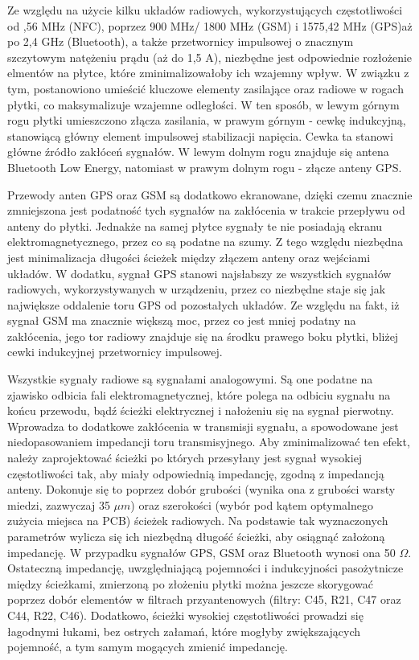 Ze względu na użycie kilku układów radiowych, wykorzystujących częstotliwości od ,56 MHz (NFC), poprzez 900 MHz/ 1800 MHz (GSM) i 1575,42 MHz (GPS)\linebreak aż po 2,4 GHz (Bluetooth), a także przetwornicy impulsowej o znacznym szczytowym natężeniu prądu (aż do 1,5 A), niezbędne jest odpowiednie rozłożenie elmentów na płytce, które zminimalizowałoby ich wzajemny wpływ. W związku z tym, postanowiono umieścić kluczowe elementy zasilające oraz radiowe w rogach płytki, co maksymalizuje wzajemne odległości. W ten sposób, w lewym górnym rogu płytki umieszczono złącza zasilania, w prawym górnym - cewkę indukcyjną, stanowiącą główny element impulsowej stabilizacji napięcia. Cewka ta stanowi główne źródło zakłóceń sygnałów. W lewym dolnym rogu znajduje się antena Bluetooth Low Energy, natomiast w prawym dolnym rogu - złącze anteny GPS. 

Przewody anten GPS oraz GSM są dodatkowo ekranowane, dzięki czemu znacznie zmniejszona jest podatność tych sygnałów na zakłócenia w trakcie przepływu od anteny do płytki. Jednakże na samej płytce sygnały te nie posiadają ekranu elektromagnetycznego, przez co są podatne na szumy. Z tego względu niezbędna jest minimalizacja długości ścieżek między złączem anteny oraz wejściami układów. W dodatku, sygnał GPS stanowi najsłabszy ze wszystkich sygnałów radiowych, wykorzystywanych w urządzeniu, przez co niezbędne staje się  jak największe oddalenie toru GPS od pozostałych układów. Ze względu na fakt, iż sygnał GSM ma znacznie większą moc, przez co jest mniej podatny na zakłócenia, jego tor radiowy znajduje się na środku prawego boku płytki, bliżej cewki indukcyjnej przetwornicy impulsowej. 

Wszystkie sygnały radiowe są sygnałami analogowymi. Są one podatne na zjawisko odbicia fali elektromagnetycznej, które polega na odbiciu sygnału na końcu przewodu, bądź ścieżki elektrycznej i nałożeniu się na sygnał pierwotny. Wprowadza to dodatkowe zakłócenia w transmisji sygnału, a spowodowane jest niedopasowaniem impedancji toru transmisyjnego. Aby zminimalizować ten efekt, należy zaprojektować ścieżki po których przesyłany jest sygnał wysokiej częstotliwości tak, aby miały odpowiednią impedancję, zgodną z impedancją anteny. Dokonuje się to poprzez dobór grubości (wynika ona z grubości warsty miedzi, zazwyczaj 35 $\mu m$) oraz szerokości (wybór pod kątem optymalnego zużycia miejsca na PCB) ścieżek radiowych. Na podstawie tak wyznaczonych parametrów wylicza się ich niezbędną długość ścieżki, aby osiągnąć założoną impedancję. W przypadku sygnałów GPS, GSM oraz Bluetooth wynosi ona 50 $\Omega$. Ostateczną impedancję, uwzględniającą pojemności i indukcyjności pasożytnicze między ścieżkami, zmierzoną po złożeniu płytki można jeszcze skorygować poprzez dobór elementów w filtrach przyantenowych (filtry: C45, R21, C47 oraz C44, R22, C46). Dodatkowo, ścieżki wysokiej częstotliwości prowadzi się łagodnymi łukami, bez ostrych załamań, które mogłyby zwiększających pojemność, a tym samym mogących zmienić impedancję. 

